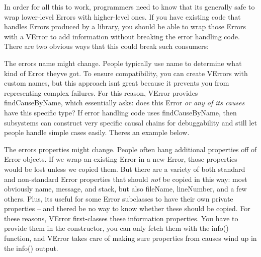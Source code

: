 In order for all this to work, programmers need to know that it\textquotesingle{}s generally safe to wrap lower-\/level Errors with higher-\/level ones. If you have existing code that handles Errors produced by a library, you should be able to wrap those Errors with a V\+Error to add information without breaking the error handling code. There are two obvious ways that this could break such consumers\+:


\begin{DoxyItemize}
\item The error\textquotesingle{}s name might change. People typically use {\ttfamily name} to determine what kind of Error they\textquotesingle{}ve got. To ensure compatibility, you can create V\+Errors with custom names, but this approach isn\textquotesingle{}t great because it prevents you from representing complex failures. For this reason, V\+Error provides {\ttfamily find\+Cause\+By\+Name}, which essentially asks\+: does this Error {\itshape or any of its causes} have this specific type? If error handling code uses {\ttfamily find\+Cause\+By\+Name}, then subsystems can construct very specific causal chains for debuggability and still let people handle simple cases easily. There\textquotesingle{}s an example below.
\item The error\textquotesingle{}s properties might change. People often hang additional properties off of Error objects. If we wrap an existing Error in a new Error, those properties would be lost unless we copied them. But there are a variety of both standard and non-\/standard Error properties that should {\itshape not} be copied in this way\+: most obviously {\ttfamily name}, {\ttfamily message}, and {\ttfamily stack}, but also {\ttfamily file\+Name}, {\ttfamily line\+Number}, and a few others. Plus, it\textquotesingle{}s useful for some Error subclasses to have their own private properties -- and there\textquotesingle{}d be no way to know whether these should be copied. For these reasons, V\+Error first-\/classes these information properties. You have to provide them in the constructor, you can only fetch them with the {\ttfamily info()} function, and V\+Error takes care of making sure properties from causes wind up in the {\ttfamily info()} output.
\end{DoxyItemize}

